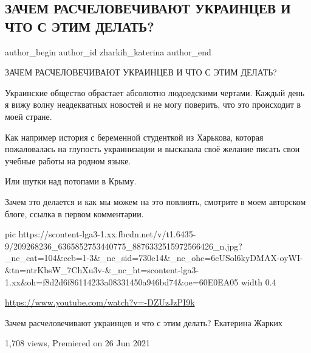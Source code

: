  
 
 
 
 
 
\subsection{ЗАЧЕМ РАСЧЕЛОВЕЧИВАЮТ УКРАИНЦЕВ И ЧТО С ЭТИМ ДЕЛАТЬ?}
\label{sec:30_06_2021.fb.zharkih_katerina.1.raschelovechivanie_ukraina}
\ifcmt
 author_begin
   author_id zharkih_katerina
 author_end
\fi

ЗАЧЕМ РАСЧЕЛОВЕЧИВАЮТ УКРАИНЦЕВ И ЧТО С ЭТИМ ДЕЛАТЬ?

Украинские общество обрастает абсолютно людоедскими чертами.  Каждый день я
вижу волну неадекватных новостей и не могу поверить, что это происходит в моей
стране. 

Как например история с беременной студенткой из Харькова, которая пожаловалась
на глупость украинизации и высказала своё желание писать свои учебные работы на
родном языке. 

Или шутки над потопами в Крыму. 

Зачем это делается и как мы можем на это повлиять, смотрите в моем авторском
блоге, ссылка в первом комментарии.

\ifcmt
  pic https://scontent-lga3-1.xx.fbcdn.net/v/t1.6435-9/209268236_6365852753440775_8876332515972566426_n.jpg?_nc_cat=104&ccb=1-3&_nc_sid=730e14&_nc_ohc=6cUSol6kyDMAX-oyWI-&tn=ntrKbsW_7ChXu3v-&_nc_ht=scontent-lga3-1.xx&oh=f8d2d6f86114233a08331450a946bd74&oe=60E0EA05
  width 0.4
\fi

\url{https://www.youtube.com/watch?v=-DZUzJzPI9k}\par
Зачем расчеловечивают украинцев и что с этим делать? Екатерина Жарких\par
1,708 views, Premiered on 26 Jun 2021\par

